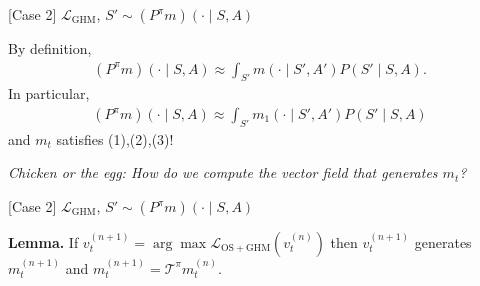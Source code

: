 \documentclass{beamer}
\begin{document}
    \begin{frame}
        \begin{minipage}{0.6\linewidth}
            [Case 2]{
                \( \mathcal{L}_{\mathrm{GHM}} \), \( S' \sim (P^{\pi} m)(\cdot \mid S, A) \)
            }
        \end{minipage}
        \par
        By definition,
        \begin{align*}
            (P^{\pi} m)(\cdot \mid S, A) \approx \int_{S'} m(\cdot \mid S', A') P(S' \mid S, A).
        \end{align*}
        In particular,
        \begin{align*}
            (P^{\pi} m)(\cdot \mid S, A) \approx \int_{S'} m_{1}(\cdot \mid S', A') P(S' \mid S, A)
        \end{align*}
        and \( m_t \) satisfies (1),(2),(3)!
        \par
        \emph{Chicken or the egg: How do we compute the vector field that generates \( m_t \)?}
    \end{frame}
    \begin{frame}
        \begin{minipage}{0.6\linewidth}
            [Case 2]{
                \( \mathcal{L}_{\mathrm{GHM}} \), \( S' \sim (P^{\pi} m)(\cdot \mid S, A) \)
            }
        \end{minipage}
        \par
        \textbf{Lemma.} If \( v_t^{(n+1)} = \arg\max \mathcal{L}_{\mathrm{OS} + \mathrm{GHM}}(v_t^{(n)})\) then \( v_t^{(n + 1)} \) generates \( m_t^{(n + 1)} \) and \( m_t^{(n + 1)} = \mathcal{T}^{\pi} m_t^{(n)} \).
        \par
\par
{}
    \end{frame}
\end{document}
